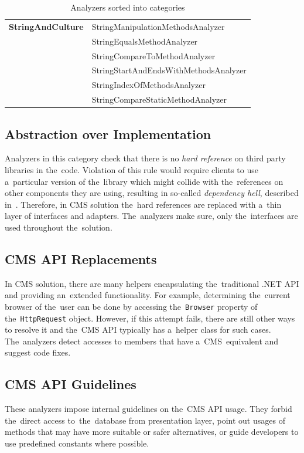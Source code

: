 \documentclass[
  digital, %
  table,   %
  lof,     %
  lot,     %
  oneside,
]{fithesis3}
\begin{document}
\begin{table}
{\begin{tabularx}{1.038\textwidth}{ll}
\textbf{StringAndCulture}
  & StringManipulationMethodsAnalyzer \\
  & StringEqualsMethodAnalyzer \\
  & StringCompareToMethodAnalyzer \\
  & StringStartAndEndsWithMethodsAnalyzer \\
  & StringIndexOfMethodsAnalyzer \\
  & StringCompareStaticMethodAnalyzer \\
\bottomrule
\end{tabularx}
}
\caption{Analyzers sorted into categories}
\label{tab:analyzer-categories-compact-table}
\end{table}

\subsection{Abstraction over Implementation}
Analyzers in this category check that there is no \textit{hard reference} on third party libraries in the~code. Violation of this rule would require clients to use a~particular version of the~library which might collide with the~references on other components they are using, resulting in so-called \textit{dependency hell}, described in~\cite{dependency-hell}. Therefore, in CMS solution the~hard references are replaced with a~thin layer of interfaces and adapters. The~analyzers make sure, only the~interfaces are used throughout the~solution.

\subsection{CMS API Replacements}
In CMS solution, there are many helpers encapsulating the~traditional .NET API and providing an~extended functionality. For example, determining the~current browser of the~user can be done by accessing the~\texttt{Browser} property of the~\texttt{HttpRequest} object. However, if this attempt fails, there are still other ways to resolve it and the~CMS API typically has a~helper class for such cases. The~analyzers detect accesses to members that have a~CMS~equivalent and suggest code fixes. 

\subsection{CMS API Guidelines}
These analyzers impose internal guidelines on the~CMS API usage. They forbid the~direct access to~the~database from presentation layer, point out usages of methods that may have more suitable or safer alternatives, or guide developers to use predefined constants where possible.
\end{document}
